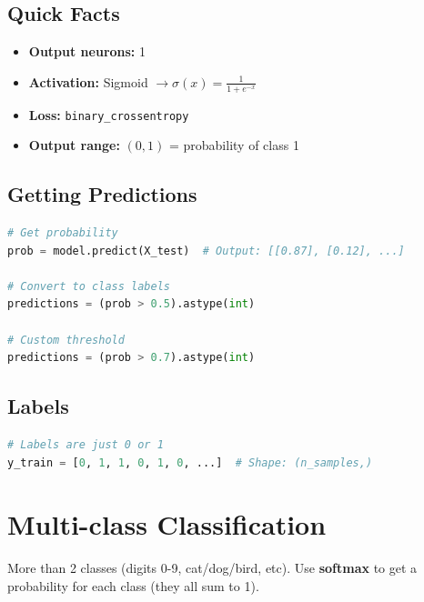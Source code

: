 \documentclass[12pt,a4paper]{article}
\begin{document}
\subsection{Quick Facts}

\begin{itemize}
    \item \textbf{Output neurons:} 1
    \item \textbf{Activation:} Sigmoid $\rightarrow \sigma(x) = \frac{1}{1 + e^{-x}}$
    \item \textbf{Loss:} \texttt{binary\_crossentropy}
    \item \textbf{Output range:} $(0, 1)$ = probability of class 1
\end{itemize}

\subsection{Getting Predictions}

\begin{lstlisting}[language=Python, caption=Binary Classification Predictions]
# Get probability
prob = model.predict(X_test)  # Output: [[0.87], [0.12], ...]

# Convert to class labels
predictions = (prob > 0.5).astype(int)

# Custom threshold
predictions = (prob > 0.7).astype(int)
\end{lstlisting}

\subsection{Labels}

\begin{lstlisting}[language=Python, caption=Binary Label Format]
# Labels are just 0 or 1
y_train = [0, 1, 1, 0, 1, 0, ...]  # Shape: (n_samples,)
\end{lstlisting}

\newpage


\section{Multi-class Classification}

More than 2 classes (digits 0-9, cat/dog/bird, etc). Use \textbf{softmax} to get a probability for each class (they all sum to 1).
\end{document}
